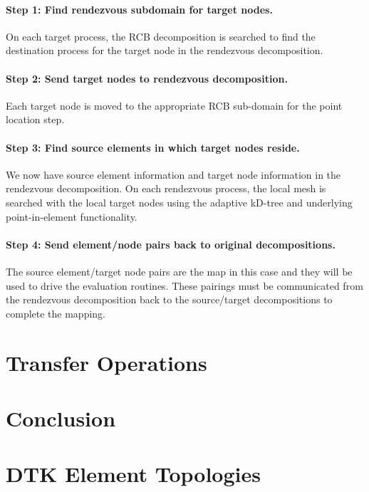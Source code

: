\documentclass[letterpaper,12pt]{article}
\begin{document}
\paragraph{Step 1: Find rendezvous subdomain for target nodes.}
On each target process, the RCB decomposition is searched to find the
destination process for the target node in the rendezvous
decomposition.

\paragraph{Step 2: Send target nodes to rendezvous decomposition.}
Each target node is moved to the appropriate RCB sub-domain for the
point location step.

\paragraph{Step 3: Find source elements in which target nodes reside.}
We now have source element information and target node information in
the rendezvous decomposition. On each rendezvous process, the local
mesh is searched with the local target nodes using the adaptive
kD-tree and underlying point-in-element functionality.

\paragraph{Step 4: Send element/node pairs back to original
  decompositions.}  The source element/target node pairs are the map
in this case and they will be used to drive the evaluation
routines. These pairings must be communicated from the rendezvous
decomposition back to the source/target decompositions to complete the
mapping.

\clearpage

\section{Transfer Operations}\label{sec:transfer}

\clearpage

\section{Conclusion}\label{sec:conc}

\clearpage

\appendix
\section{DTK Element Topologies}\label{apdx:cell_topo}

\pagebreak


\end{document}
